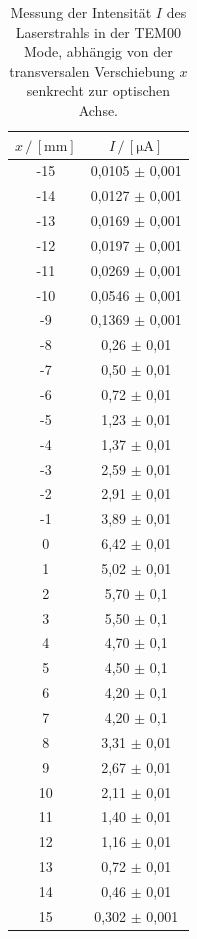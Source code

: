 \begin{table}[H]
    
    \centering
    \caption{Messung der Intensität $I$ des Laserstrahls in der TEM00 Mode, abhängig von der transversalen Verschiebung $x$ senkrecht zur optischen Achse.}
    \begin{tabular}{cc}
    \toprule
    $x \,/\, [\unit{\milli\meter}]$ &
    $I \,/\, [\unit{\micro\ampere}]$\\
    \midrule
    -15 & 0,0105 $\pm$ 0,001 \\
    -14 & 0,0127 $\pm$ 0,001 \\
    -13 & 0,0169 $\pm$ 0,001 \\
    -12 & 0,0197 $\pm$ 0,001 \\
    -11 & 0,0269 $\pm$ 0,001 \\
    -10 & 0,0546 $\pm$ 0,001 \\
    -9  & 0,1369 $\pm$ 0,001 \\
    -8  & 0,26   $\pm$ 0,01  \\
    -7  & 0,50   $\pm$ 0,01  \\
    -6  & 0,72   $\pm$ 0,01  \\
    -5  & 1,23   $\pm$ 0,01  \\
    -4  & 1,37   $\pm$ 0,01  \\
    -3  & 2,59   $\pm$ 0,01  \\
    -2  & 2,91   $\pm$ 0,01  \\
    -1  & 3,89   $\pm$ 0,01  \\
    0   & 6,42   $\pm$ 0,01  \\
    1   & 5,02   $\pm$ 0,01  \\
    2   & 5,70   $\pm$ 0,1   \\
    3   & 5,50   $\pm$ 0,1   \\
    4   & 4,70   $\pm$ 0,1   \\
    5   & 4,50   $\pm$ 0,1   \\
    6   & 4,20   $\pm$ 0,1   \\
    7   & 4,20   $\pm$ 0,1   \\
    8   & 3,31   $\pm$ 0,01  \\
    9   & 2,67   $\pm$ 0,01  \\
    10  & 2,11   $\pm$ 0,01  \\
    11  & 1,40   $\pm$ 0,01  \\
    12  & 1,16   $\pm$ 0,01  \\
    13  & 0,72   $\pm$ 0,01  \\
    14  & 0,46   $\pm$ 0,01  \\
    15  & 0,302  $\pm$ 0,001 \\
    \bottomrule
    \end{tabular}
    \label{tab:tem00}
\end{table}






